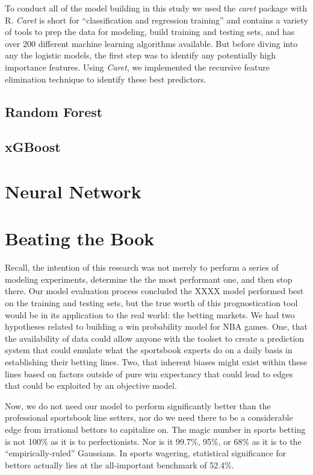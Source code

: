 \documentclass [MS] {uclathes}
\begin{document}
To conduct all of the model building in this study we used the \emph{caret} package with R. \emph{Caret} is short for ``classification and regression training'' and contains a variety of tools to prep the data for modeling, build training and testing sets, and has over 200 different machine learning algorithms available. But before diving into any the logistic models, the first step was to identify any potentially high importance features. Using \emph{Caret}, we implemented the recursive feature elimination technique to identify these best predictors.



\section{Random Forest}

\section{xGBoost}


\chapter{Neural Network}

\chapter{Beating the Book}

Recall, the intention of this research was not merely to perform a series of modeling experiments, determine the the most performant one, and then stop there. Our model evaluation process concluded the XXXX model performed best on the training and testing sets, but the true worth of this prognostication tool would be in its application to the real world: the betting markets. We had two hypotheses related to building a win probability model for NBA games. One, that the availability of data could allow anyone with the toolset to create a prediction system that could emulate what the sportsbook experts do on a daily basis in establishing their betting lines. Two, that inherent biases might exist within these lines based on factors outside of pure win expectancy that could lead to edges that could be exploited by an objective model.

Now, we do not need our model to perform significantly better than the professional sportsbook line setters, nor do we need there to be a considerable edge from irrational bettors to capitalize on. The magic number in sports betting is not 100\% as it is to perfectionists. Nor is it 99.7\%, 95\%, or 68\% as it is to the ``empirically-ruled'' Gaussians. In sports wagering, statistical significance for bettors actually lies at the all-important benchmark of 52.4\%. \cite{medium524}
\end{document}
